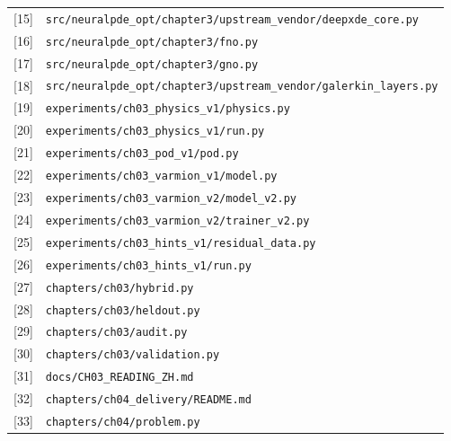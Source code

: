 \documentclass[a4paper,10pt]{article}
\begin{document}
\begin{longtable}{>{\raggedright\arraybackslash}p{}>{\raggedright\arraybackslash}p{}}
\leavevmode\hypertarget{source-15}{[15]} & \nolinkurl{src/neuralpde_opt/chapter3/upstream_vendor/deepxde_core.py} \\[2pt]
\leavevmode\hypertarget{source-16}{[16]} & \nolinkurl{src/neuralpde_opt/chapter3/fno.py} \\[2pt]
\leavevmode\hypertarget{source-17}{[17]} & \nolinkurl{src/neuralpde_opt/chapter3/gno.py} \\[2pt]
\leavevmode\hypertarget{source-18}{[18]} & \nolinkurl{src/neuralpde_opt/chapter3/upstream_vendor/galerkin_layers.py} \\[2pt]
\leavevmode\hypertarget{source-19}{[19]} & \nolinkurl{experiments/ch03_physics_v1/physics.py} \\[2pt]
\leavevmode\hypertarget{source-20}{[20]} & \nolinkurl{experiments/ch03_physics_v1/run.py} \\[2pt]
\leavevmode\hypertarget{source-21}{[21]} & \nolinkurl{experiments/ch03_pod_v1/pod.py} \\[2pt]
\leavevmode\hypertarget{source-22}{[22]} & \nolinkurl{experiments/ch03_varmion_v1/model.py} \\[2pt]
\leavevmode\hypertarget{source-23}{[23]} & \nolinkurl{experiments/ch03_varmion_v2/model_v2.py} \\[2pt]
\leavevmode\hypertarget{source-24}{[24]} & \nolinkurl{experiments/ch03_varmion_v2/trainer_v2.py} \\[2pt]
\leavevmode\hypertarget{source-25}{[25]} & \nolinkurl{experiments/ch03_hints_v1/residual_data.py} \\[2pt]
\leavevmode\hypertarget{source-26}{[26]} & \nolinkurl{experiments/ch03_hints_v1/run.py} \\[2pt]
\leavevmode\hypertarget{source-27}{[27]} & \nolinkurl{chapters/ch03/hybrid.py} \\[2pt]
\leavevmode\hypertarget{source-28}{[28]} & \nolinkurl{chapters/ch03/heldout.py} \\[2pt]
\leavevmode\hypertarget{source-29}{[29]} & \nolinkurl{chapters/ch03/audit.py} \\[2pt]
\leavevmode\hypertarget{source-30}{[30]} & \nolinkurl{chapters/ch03/validation.py} \\[2pt]
\leavevmode\hypertarget{source-31}{[31]} & \nolinkurl{docs/CH03_READING_ZH.md} \\[2pt]
\leavevmode\hypertarget{source-32}{[32]} & \nolinkurl{chapters/ch04_delivery/README.md} \\[2pt]
\leavevmode\hypertarget{source-33}{[33]} & \nolinkurl{chapters/ch04/problem.py} \\[2pt]

\end{longtable}
\end{document}
